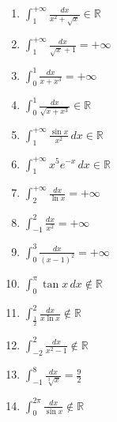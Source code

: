 \documentclass[11pt,a4paper]{article}
\begin{document}
\begin{enumerate}
\item $\displaystyle \int_{1}^{+\infty} \frac{dx}{x^{2} + \sqrt{x}} \in \mathbb{R}$
\item $\displaystyle \int_{1}^{+\infty} \frac{dx}{\sqrt{x} + 1} = +\infty$
\item $\displaystyle \int_{0}^{1} \frac{dx}{x + x^{3}} = +\infty$
\item $\displaystyle \int_{0}^{1} \frac{dx}{\sqrt{x + x^{3}}} \in \mathbb{R}$
\item $\displaystyle \int_{1}^{+\infty} \frac{\sin x}{x^{2}} \, dx \in \mathbb{R}$
\item $\displaystyle \int_{1}^{+\infty} x^{5} e^{-x} \, dx \in \mathbb{R}$
\item $\displaystyle \int_{2}^{+\infty} \frac{dx}{\ln x} = +\infty$
\item $\displaystyle \int_{-1}^{2} \frac{dx}{x^{2}} = +\infty$
\item $\displaystyle \int_{0}^{3} \frac{dx}{(x - 1)^{2}} = +\infty$
\item $\displaystyle \int_{0}^{\pi} \tan x \, dx \notin \mathbb{R}$
\item $\displaystyle \int_{\frac{1}{2}}^{2} \frac{dx}{x \ln x} \notin \mathbb{R}$
\item $\displaystyle \int_{-2}^{2} \frac{dx}{x^{2} - 1} \notin \mathbb{R}$
\item $\displaystyle \int_{-1}^{8} \frac{dx}{\sqrt[3]{x}} = \frac{9}{2}$
\item $\displaystyle \int_{0}^{2\pi} \frac{dx}{\sin x} \notin \mathbb{R}$
\end{enumerate}
\end{document}

